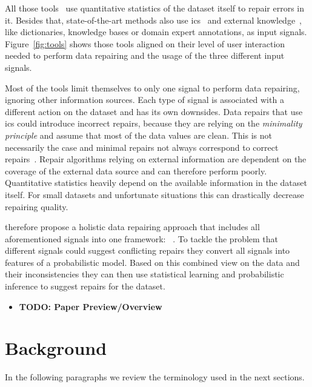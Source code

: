   All those tools~\cite{scare,potters_wheel,data_wrangler,trifacta_wrangler} use quantitative statistics of the dataset itself to repair errors in it.
  Besides that, state-of-the-art methods also use \glspl{ic}~\cite{ajax,gdr,editing_rules,data_tamer} and external knowledge~\cite{katara}, like dictionaries, knowledge bases or domain expert annotations, as input signals.
  Figure~\ref{fig:tools} shows those tools aligned on their level of user interaction needed to perform data repairing and the usage of the three different input signals.

  \begin{figure*}
    \centering
    
    \caption{Data Repairing Tools in Context}
    \label{fig:tools}
  \end{figure*}

  \bigskip
  Most of the tools limit themselves to only one signal to perform data repairing, ignoring other information sources.
  Each type of signal is associated with a different action on the dataset and has its own downsides.
  Data repairs that use \glspl{ic} could introduce incorrect repairs, because they are relying on the \textit{minimality principle} and assume that most of the data values are clean.
  This is not necessarily the case and minimal repairs not always correspond to correct repairs~\cite{holoclean}.
  Repair algorithms relying on external information are dependent on the coverage of the external data source and can therefore perform poorly.
  Quantitative statistics heavily depend on the available information in the dataset itself.
  For small datasets and unfortunate situations this can drastically decrease repairing quality.
  
  \citeauthor{holoclean} therefore propose a holistic data repairing approach that includes all aforementioned signals into one framework: \holoclean{}~\cite{holoclean}.
  To tackle the problem that different signals could suggest conflicting repairs they convert all signals into features of a probabilistic model.
  Based on this combined view on the data and their inconsistencies they can then use statistical learning and probabilistic inference to suggest repairs for the dataset.
  
  \begin{itemize}
    \item \textbf{TODO: Paper Preview/Overview}
  \end{itemize}


\section{Background}\label{sec:background}
  In the following paragraphs we review the terminology used in the next sections.
  
